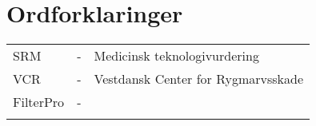 
\chapter{Ordforklaringer}

\begin{table}[H]
\center
{}
\begin{tabularx}{\linewidth}{l l X}	
SRM         & - &   Medicinsk teknologivurdering \\ \addlinespace[2mm]
VCR         & - &   Vestdansk Center for Rygmarvsskade \\ \addlinespace[2mm]
FilterPro  & - &   \\ \addlinespace[2mm]

\end{tabularx}
\end{table}


